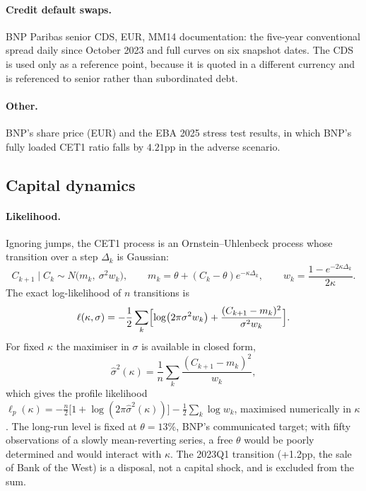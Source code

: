 \paragraph{Credit default swaps.} BNP Paribas senior CDS, EUR, MM14 documentation:
the five-year conventional spread daily since October 2023 and full curves on six
snapshot dates. The CDS is used only as a reference point, because it is quoted in a
different currency and is referenced to senior rather than subordinated debt.

\paragraph{Other.} BNP's share price (EUR) and the EBA 2025 stress test results, in which
BNP's fully loaded CET1 ratio falls by $4.21$pp in the adverse scenario.

\subsection{Capital dynamics}

\paragraph{Likelihood.} Ignoring jumps, the CET1 process is an Ornstein--Uhlenbeck process
whose transition over a step $\Delta_k$ is Gaussian:
\begin{equation}\label{eq:outrans}
  C_{k+1}\mid C_k\sim N\bigl(m_k,\ \sigma^2w_k\bigr),\qquad
  m_k=\theta+(C_k-\theta)e^{-\kappa\Delta_k},\qquad
  w_k=\frac{1-e^{-2\kappa\Delta_k}}{2\kappa}.
\end{equation}
The exact log-likelihood of $n$ transitions is
\begin{equation}\label{eq:loglik}
  \ell(\kappa,\sigma)=-\frac12\sum_{k}\Bigl[\log\bigl(2\pi\sigma^2w_k\bigr)
  +\frac{(C_{k+1}-m_k)^2}{\sigma^2w_k}\Bigr].
\end{equation}
For fixed $\kappa$ the maximiser in $\sigma$ is available in closed form,
\begin{equation}\label{eq:sigmahat}
  \hat\sigma^2(\kappa)=\frac1n\sum_k\frac{(C_{k+1}-m_k)^2}{w_k},
\end{equation}
which gives the profile likelihood
$\ell_p(\kappa)=-\frac n2\bigl[1+\log(2\pi\hat\sigma^2(\kappa))\bigr]-\frac12\sum_k\log w_k$,
maximised numerically in $\kappa$. The long-run level is fixed at $\theta=13\%$, BNP's
communicated target; with fifty observations of a slowly mean-reverting series, a free
$\theta$ would be poorly determined and would interact with $\kappa$. The 2023Q1 transition
(+1.2pp, the sale of Bank of the West) is a disposal, not a capital shock, and is excluded
from the sum.

